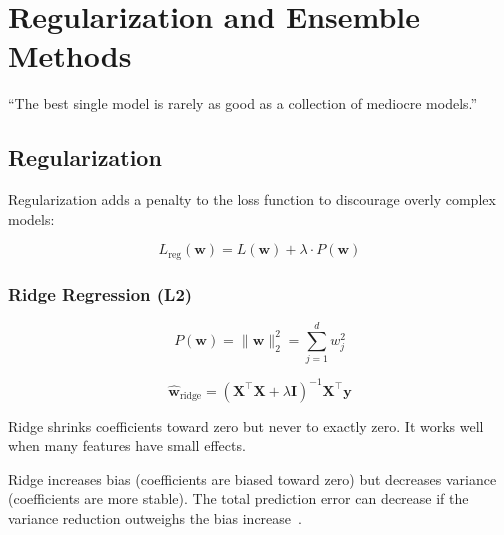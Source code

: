 \chapter{Regularization and Ensemble Methods}
\label{ch:regularization}

\epigraph{``The best single model is rarely as good as a collection of mediocre models.''}{}


\section{Regularization}

Regularization adds a penalty to the loss function to discourage overly complex models:

\[
	L_{\text{reg}}(\mathbf{w}) = L(\mathbf{w}) + \lambda \cdot P(\mathbf{w})
\]

\subsection{Ridge Regression (L2)}

\[
	P(\mathbf{w}) = \|\mathbf{w}\|_2^2 = \sum_{j=1}^d w_j^2
\]

\[
	\hat{\mathbf{w}}_{\text{ridge}} = (\mathbf{X}^\top \mathbf{X} + \lambda \mathbf{I})^{-1} \mathbf{X}^\top \mathbf{y}
\]

Ridge shrinks coefficients toward zero but never to exactly zero. It works well when many features have small effects.

\begin{definition}
	Ridge increases bias (coefficients are biased toward zero) but decreases variance (coefficients are more stable). The total prediction error can decrease if the variance reduction outweighs the bias increase~\cite{hoerl1970ridge}.
\end{definition}

